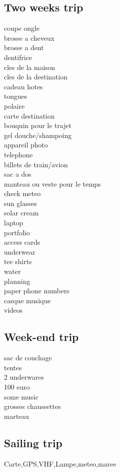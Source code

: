\documentclass[8pt]{article} %
\begin{document}
\subsection{Two weeks trip}
coupe ongle\\
brosse a cheveux\\
brosse a dent\\
dentifrice\\
cles de la maison\\
cles de la destination\\
cadeau hotes\\
tongues\\
polaire\\
carte destination\\
bouquin pour le trajet\\
gel douche/shampoing\\
appareil photo\\
telephone\\
billets de train/avion\\
sac a dos\\
manteau ou veste pour le temps\\
check meteo\\
sun glasses\\
solar cream\\
laptop\\
portfolio\\
access cards\\
underwear\\
tee shirts\\
water\\
planning\\
paper phone numbers\\
casque musique\\
videos\\

\subsection{Week-end trip}
sac de couchage\\
tentes\\
2 underwares\\
100 euro\\
some music\\
grosses chaussettes\\
marteau\\

\subsection{Sailing trip}
Carte,GPS,VHF,Lampe,meteo,maree\\
\end{document}
